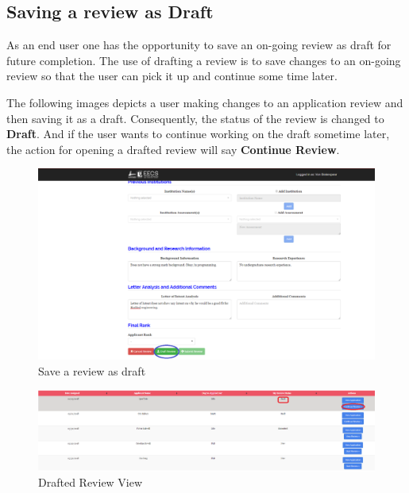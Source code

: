 \documentclass[fontsize=12pt,paper=letter,twoside]{scrartcl}
\begin{document}
\clearpage
\newpage
\subsection{Saving a review as Draft}
As an end user one has the opportunity to save an on-going review as draft for future completion. The use of drafting a review is to save changes to an on-going review so that the user can pick it up and continue some time later.

\bigskip
\noindent The following images depicts a user making changes to an application review and then saving it as a draft. Consequently, the status of the review is changed to \textbf{Draft}. And if the user wants to continue working on the draft sometime later, the action for opening a drafted review will say \textbf{Continue Review}.

\begin{figure}[!htb]
\begin{center}
\includegraphics[width=.9\textwidth]{images/save_as_draft_review.png}
\end{center}
\caption{Save a review as draft}
\label{fig:save_as_draft_review}
\end{figure}

\begin{figure}[!htb]
\begin{center}
\includegraphics[width=.9\textwidth]{images/drafted_review.png}
\end{center}
\caption{Drafted Review View}
\label{fig:drafted_review}
\end{figure}
\end{document}
